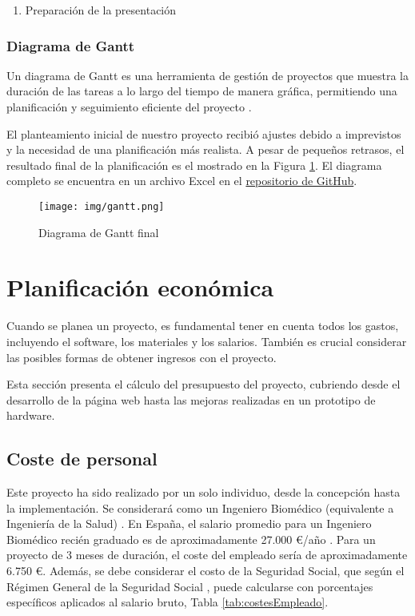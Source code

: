 \begin{enumerate}
    \item Preparación de la presentación
\end{enumerate}



\subsubsection{Diagrama de Gantt}
Un diagrama de Gantt es una herramienta de gestión de proyectos que muestra la duración de las tareas a lo largo del tiempo de manera gráfica, permitiendo una planificación y seguimiento eficiente del proyecto \cite{gantt}.

El planteamiento inicial de nuestro proyecto recibió ajustes debido a imprevistos y la necesidad de una planificación más realista. A pesar de pequeños retrasos, el resultado final de la planificación es el mostrado en la Figura \ref{fig:gantt}. El diagrama completo se encuentra en un archivo Excel en el \href{https://github.com/diegotrascasa/TFG_Diego_Trascasa_Garcia/blob/main/Diagrama%20Gantt.xlsx}{repositorio de GitHub}.


\begin{figure}[h]
\centering
\texttt{[image: img/gantt.png]}
\caption{Diagrama de Gantt final}
\label{fig:gantt}
\end{figure}

\section{Planificación económica}

Cuando se planea un proyecto, es fundamental tener en cuenta todos los gastos, incluyendo el software, los materiales y los salarios. También es crucial considerar las posibles formas de obtener ingresos con el proyecto.

Esta sección presenta el cálculo del presupuesto del proyecto, cubriendo desde el desarrollo de la página web hasta las mejoras realizadas en un prototipo de hardware.

\subsection{Coste de personal}

Este proyecto ha sido realizado por un solo individuo, desde la concepción hasta la implementación. Se considerará como un Ingeniero Biomédico (equivalente a Ingeniería de la Salud) . En España, el salario promedio para un Ingeniero Biomédico recién graduado es de aproximadamente 27.000 €/año \cite{infojobs}. Para un proyecto de 3 meses de duración, el coste del empleado sería de aproximadamente 6.750 €. Además, se debe considerar el costo de la Seguridad Social, que según el Régimen General de la Seguridad Social \cite{seguridadsocial}, puede calcularse con porcentajes específicos aplicados al salario bruto, Tabla \ref{tab:costesEmpleado}.

